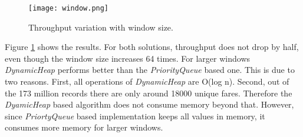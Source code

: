 \begin{figure}[!t]
        \centering
        \texttt{[image: window.png]}
        \caption{Throughput variation with window size.}
        \label{window}
\end{figure}

Figure \ref{window} shows the results. For both solutions, throughput does not drop by half, even though the window size increases 64 times. For larger windows \textit{DynamicHeap} performs better than the \textit{PriorityQueue} based one. This is due to two reasons. First, all operations of \textit{DynamicHeap} are O(log n). Second, out of the 173 million records there are only around 18000 unique fares. Therefore the \textit{DyamicHeap} based algorithm does not consume memory beyond that. However, since \textit{PriortyQueue} based implementation keeps all values in memory, it consumes more memory for larger windows.
